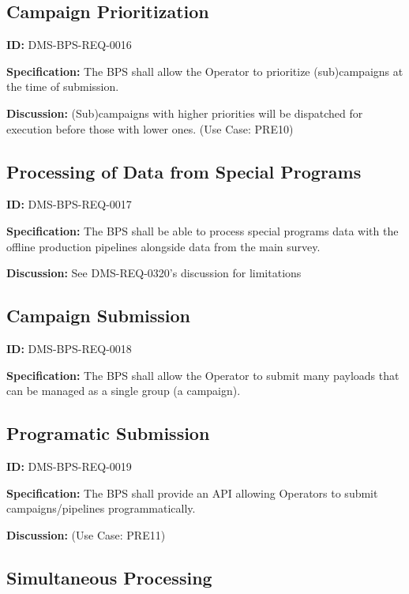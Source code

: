 \documentclass[SE,toc,lsstdraft]{lsstdoc}
\begin{document}
\subsection{Campaign Prioritization}

\label{DMS-BPS-REQ-0016}
\textbf{ID:} DMS-BPS-REQ-0016

\textbf{Specification:}
The BPS shall allow the Operator to prioritize (sub)campaigns at the time of submission.

\textbf{Discussion:}
(Sub)campaigns with higher priorities will be dispatched for execution before those with lower ones.  (Use Case: PRE10)

\subsection{Processing of Data from Special Programs}

\label{DMS-BPS-REQ-0017}
\textbf{ID:} DMS-BPS-REQ-0017

\textbf{Specification:}
The BPS shall be able to process special programs data with the offline production pipelines alongside data from the main survey.

\textbf{Discussion:}
See DMS-REQ-0320’s discussion for limitations

\subsection{Campaign Submission}

\label{DMS-BPS-REQ-0018}
\textbf{ID:} DMS-BPS-REQ-0018

\textbf{Specification:}
The BPS shall allow the Operator to submit many payloads that can be managed as a single group (a campaign).

\subsection{Programatic Submission}

\label{DMS-BPS-REQ-0019}
\textbf{ID:} DMS-BPS-REQ-0019

\textbf{Specification:}
The BPS shall provide an API allowing Operators to submit campaigns/pipelines programmatically.

\textbf{Discussion:}
(Use Case: PRE11)

\subsection{Simultaneous Processing}
\end{document}
